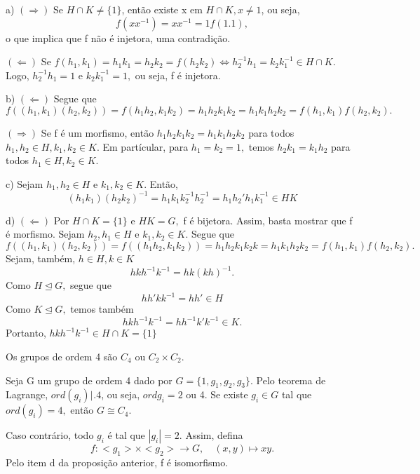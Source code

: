 \documentclass[Algebra/algebra_notes.tex]{subfiles}
\begin{document}
\begin{proof*}
	a) $(\Rightarrow)$ Se $H\cap{K}\neq\{1\}$, então existe x em $H\cap{K}, x\neq 1$, ou seja,
	$$
		f(xx^{-1}) = xx^{-1} = 1 f(1.1),
	$$
	o que implica que f não é injetora, uma contradição.

	$(\Leftarrow)$ Se $f(h_{1},k_{1})=h_{1}k_{1}=h_{2}k_{2} = f(h_{2}k_{2}) \Longleftrightarrow h_{2}^{-1}h_{1} = k_{2}k_{1}^{-1}\in H\cap K$. Logo,
	$h_{2}^{-1}h_{1} = 1$ e $k_{2}k_{1}^{-1} = 1,$ ou seja, f é injetora.

	b) $(\Leftarrow)$ Segue que $f((h_{1},k_{1})(h_{2},k_{2})) = f(h_{1}h_{2}, k_{1}k_{2}) = h_{1}h_{2}k_{1}k_{2} = h_{1}k_{1}h_{2}k_{2} =
		f(h_{1}, k_{1})f(h_{2},k_{2}).$

	$(\Rightarrow)$ Se f é um morfismo, então $h_{1}h_{2}k_{1}k_{2} = h_{1}k_{1}h_{2}k_{2}$ para todos $h_{1},h_{2}\in H, k_{1},k_{2}\in K.$
	Em partícular, para $h_{1}=k_{2}=1,$ temos $h_{2}k_{1} = k_{1}h_{2}$ para todos $h_{1}\in H, k_{2}\in K.$

	c) Sejam $h_{1}, h_{2}\in H$ e $k_{1}, k_{2}\in K$. Então,
	$$
		(h_{1}k_{1})(h_{2}k_{2})^{-1} = h_{1}k_{1}k_{2}^{-1}h_{2}^{-1} = h_{1}h_{2}'h_{1}k_{1}^{-1}\in HK
	$$

	d) $(\Leftarrow)$ Por $H\cap K = \{1\}$ e $HK = G,$ f é bijetora. Assim, basta mostrar que f é morfismo.
	Sejam $h_{2}, h_{1}\in H$ e $k_{1}, k_{2}\in K$. Segue que
	$$
		f((h_{1},k_{1})(h_{2}, k_{2})) = f((h_{1}h_{2}, k_{1}k_{2})) = h_{1}h_{2}k_{1}k_{2}k = h_{1}k_{1}h_{2}k_{2} = f(h_{1}, k_{1})f(h_{2}, k_{2}).
	$$
	Sejam, também, $h\in H, k\in K$
	$$
		hkh^{-1}k^{-1} = hk(kh)^{-1}.
	$$
	Como $H\trianglelefteq{G},$ segue que
	$$
		hh'kk^{-1} = hh'\in H
	$$
	Como $K\trianglelefteq{G},$ temos também
	$$
		hkh^{-1}k^{-1} = hh^{-1}k'k^{-1}\in K.
	$$
	Portanto, $hkh^{-1}k^{-1}\in H\cap K=\{1\}$ \qedsymbol
\end{proof*}
\begin{prop*}
	Os grupos de ordem 4 são $C_{4}$ ou $C_{2}\times C_{2}.$
\end{prop*}
\begin{proof*}
	Seja G um grupo de ordem 4 dado por $G=\{1, g_{1}, g_{2}, g_{3}\}$. Pelo teorema de Lagrange, $ord(g_{i})\biggl|_{}^{}\biggr.4$,
	ou seja, $ord g_{i} = 2$ ou 4. Se existe $g_{i}\in G$ tal que $ord(g_{i}) = 4,$ então $G\cong C_{4}.$

	Caso contrário, todo $g_{i}$ é tal que $|g_{i}|=2.$ Assim, defina
	$$
		f:<g_{1}>\times<g_{2}>\rightarrow G,\quad (x,y)\mapsto xy.
	$$
	Pelo item d da proposição anterior, f é isomorfismo. \qedsymbol
\end{proof*}
\end{document}
